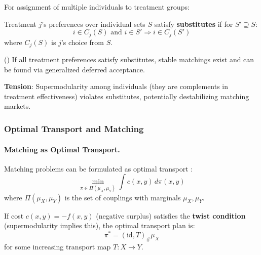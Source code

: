 For assignment of multiple individuals to treatment groups:

\begin{definition}
\label{def:substitutes}
Treatment $j$'s preferences over individual sets $S$ satisfy \textbf{substitutes} 
if for $S' \supseteq S$:
\begin{equation}
i \in C_j(S) \text{ and } i \in S' \Rightarrow i \in C_j(S')
\end{equation}
where $C_j(S)$ is $j$'s choice from $S$.
\end{definition}

\begin{theorem}
\label{thm:kelso-crawford}
\textup{(\citet{kelso1982job})}
If all treatment preferences satisfy substitutes, stable matchings exist and can 
be found via generalized deferred acceptance.
\end{theorem}

\textbf{Tension}: Supermodularity among individuals (they are complements in treatment 
effectiveness) violates substitutes, potentially destabilizing matching markets.

\subsubsection{Optimal Transport and Matching}

\paragraph{Matching as Optimal Transport.}

Matching problems can be formulated as optimal transport \citep{villani2009optimal}:
\begin{equation}
\min_{\pi \in \Pi(\mu_X, \mu_Y)} \int c(x, y) \, d\pi(x, y)
\end{equation}
where $\Pi(\mu_X, \mu_Y)$ is the set of couplings with marginals $\mu_X, \mu_Y$.

\begin{theorem}
\label{thm:brenier}
If cost $c(x, y) = -f(x, y)$ (negative surplus) satisfies the \textbf{twist condition} 
(supermodularity implies this), the optimal transport plan is:
\begin{equation}
\pi^* = (\text{id}, T)_{\#} \mu_X
\end{equation}
for some increasing transport map $T: X \to Y$.
\end{theorem}

